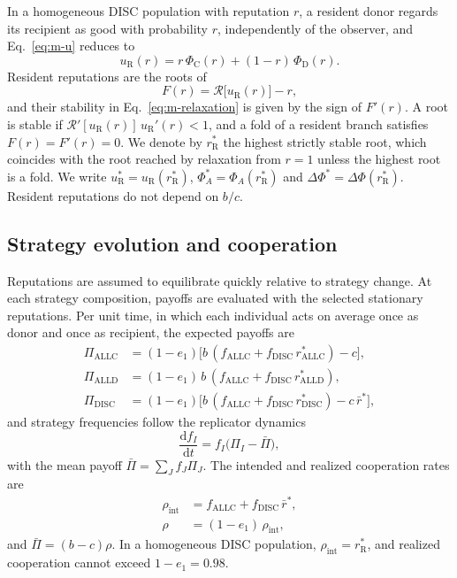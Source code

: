 \documentclass[10pt]{wlscirep}
\newcommand{\Rmap}{\mathscr{R}}            %
\newcommand{\rR}{r_{\mathrm{R}}^{*}}
\newcommand{\uR}{u_{\mathrm{R}}^{*}}
\newcommand{\PhiC}{\Phi_{\mathrm{C}}}
\newcommand{\PhiD}{\Phi_{\mathrm{D}}}
\newcommand{\dPhi}{\Delta\Phi^{*}}
\newcommand{\dd}{\mathrm{d}}
\newcommand{\ALLC}{\mathrm{ALLC}}
\newcommand{\ALLD}{\mathrm{ALLD}}
\newcommand{\DISC}{\mathrm{DISC}}
\theoremstyle{plain}
\theoremstyle{remark}
\begin{document}
In a homogeneous DISC population with reputation $r$, a resident donor regards its recipient as good with probability $r$, independently of the observer, and Eq.~\eqref{eq:m-u} reduces to
\begin{equation}
u_{\mathrm R}(r)=r\,\PhiC(r)+(1-r)\,\PhiD(r).
\label{eq:m-resident}
\end{equation}
Resident reputations are the roots of
\begin{equation}
F(r)=\Rmap\bigl[u_{\mathrm R}(r)\bigr]-r,
\label{eq:m-F}
\end{equation}
and their stability in Eq.~\eqref{eq:m-relaxation} is given by the sign of $F'(r)$. A root is stable if $\Rmap'[u_{\mathrm R}(r)]\,u_{\mathrm R}'(r)<1$, and a fold of a resident branch satisfies $F(r)=F'(r)=0$. We denote by $\rR$ the highest strictly stable root, which coincides with the root reached by relaxation from $r=1$ unless the highest root is a fold. We write $\uR=u_{\mathrm R}(\rR)$, $\Phi_A^*=\Phi_A(\rR)$ and $\dPhi=\Delta\Phi(\rR)$. Resident reputations do not depend on $b/c$.

\subsection*{Strategy evolution and cooperation}

Reputations are assumed to equilibrate quickly relative to strategy change. At each strategy composition, payoffs are evaluated with the selected stationary reputations. Per unit time, in which each individual acts on average once as donor and once as recipient, the expected payoffs are
\begin{equation}
\begin{aligned}
\Pi_{\ALLC}&=(1-e_1)\bigl[b\,(f_{\ALLC}+f_{\DISC}\,r^*_{\ALLC})-c\bigr],\\
\Pi_{\ALLD}&=(1-e_1)\,b\,(f_{\ALLC}+f_{\DISC}\,r^*_{\ALLD}),\\
\Pi_{\DISC}&=(1-e_1)\bigl[b\,(f_{\ALLC}+f_{\DISC}\,r^*_{\DISC})-c\,\bar r^*\bigr],
\end{aligned}
\label{eq:m-payoffs}
\end{equation}
and strategy frequencies follow the replicator dynamics\cite{hofbauer1998}
\begin{equation}
\frac{\dd f_I}{\dd t}=f_I\bigl(\Pi_I-\bar\Pi\bigr),
\label{eq:m-replicator}
\end{equation}
with the mean payoff $\bar\Pi=\sum_Jf_J\Pi_J$. The intended and realized cooperation rates are
\begin{equation}
\begin{aligned}
\rho_{\mathrm{int}}&=f_{\ALLC}+f_{\DISC}\,\bar r^*,\\
\rho&=(1-e_1)\,\rho_{\mathrm{int}},
\end{aligned}
\label{eq:m-cooperation}
\end{equation}
and $\bar\Pi=(b-c)\rho$. In a homogeneous DISC population, $\rho_{\mathrm{int}}=\rR$, and realized cooperation cannot exceed $1-e_1=0.98$.
\end{document}
